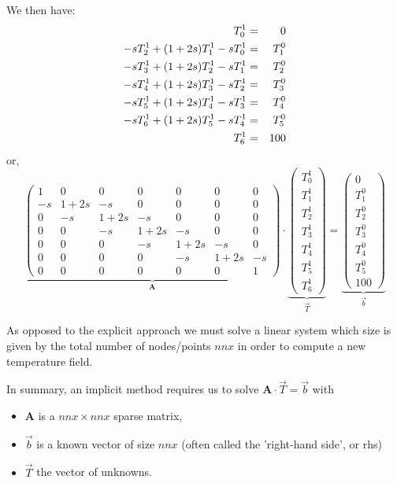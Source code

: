 We then have:
\begin{eqnarray}
T_0^1 &=& 0 \nonumber\\
-s T_{2}^{1} + (1+2s) T_{1}^{1} - s T_{0}^{1} &=& T_1^{0} \nonumber\\
-s T_{3}^{1} + (1+2s) T_{2}^{1} - s T_{1}^{1} &=& T_2^{0} \nonumber\\
-s T_{4}^{1} + (1+2s) T_{3}^{1} - s T_{2}^{1} &=& T_3^{0} \nonumber\\
-s T_{5}^{1} + (1+2s) T_{4}^{1} - s T_{3}^{1} &=& T_4^{0} \nonumber\\
-s T_{6}^{1} + (1+2s) T_{5}^{1} - s T_{4}^{1} &=& T_5^{0} \nonumber\\
T_6^1 &=& 100\nonumber
\end{eqnarray}
or, 
\[
\underbrace{
\left(
\begin{array}{ccccccc}
1 & 0 & 0 & 0 & 0 & 0 & 0  \\
-s & 1+2s & -s & 0 & 0 & 0 & 0 \\
0 & -s & 1+2s & -s & 0 & 0 & 0 \\
0 & 0 & -s & 1+2s & -s & 0 & 0 \\
0 & 0 & 0 & -s & 1+2s & -s & 0 \\
0 & 0 & 0 & 0 & -s & 1+2s & -s \\
0 & 0 & 0 & 0 & 0 & 0 & 1
\end{array}
\right)
}_{\bm A}
\cdot
\underbrace{
\left(
\begin{array}{ccccccc}
T_0^1 \\ T_1^1 \\ T_2^1 \\ T_3^1 \\ T_4^1 \\ T_5^1 \\ T_6^1  
\end{array}
\right)
}_{\vec{T}}
=
\underbrace{
\left(
\begin{array}{ccccccc}
0 \\ T_1^0\\ T_2^0\\ T_3^0\\ T_4^0\\ T_5^0 \\ 100
\end{array}
\right)
}_{\vec{b}}
\]

As opposed to the explicit approach we must solve a linear system which size is given 
by the total number of nodes/points $nnx$ in order to compute a new temperature field.

In summary, an implicit method requires us to solve ${\bm A}\cdot\vec{T} = \vec{b}$ with
\begin{itemize}
\item ${\bm A}$ is a $nnx \times nnx$  sparse matrix,
\item ${\vec b}$ is a known vector of size $nnx$ (often called the 'right-hand side', or {\color{olive} rhs})
\item ${\vec T}$ the vector of unknowns.
\end{itemize}




